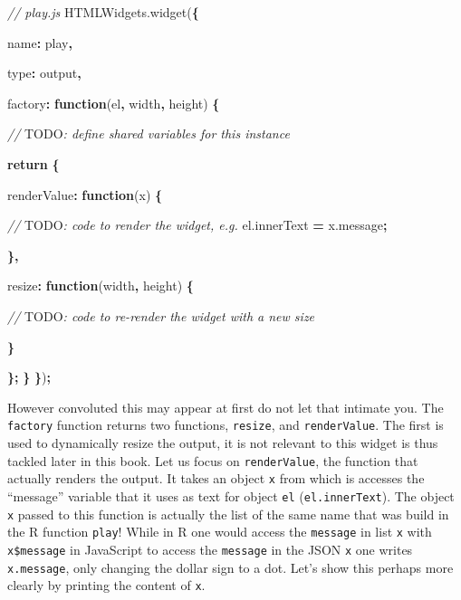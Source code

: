 \documentclass[
]{krantz}
\makeatletter
\newenvironment{Shaded}{\begin{snugshade}}{\end{snugshade}}
\newcommand{\AlertTok}[1]{\textcolor[rgb]{0.33,0.33,0.33}{#1}}
\newcommand{\AttributeTok}[1]{\textcolor[rgb]{0.61,0.61,0.61}{#1}}
\newcommand{\CommentTok}[1]{\textcolor[rgb]{0.37,0.37,0.37}{\textit{#1}}}
\newcommand{\ControlFlowTok}[1]{\textcolor[rgb]{0.27,0.27,0.27}{\textbf{#1}}}
\newcommand{\DataTypeTok}[1]{\textcolor[rgb]{0.27,0.27,0.27}{#1}}
\newcommand{\KeywordTok}[1]{\textcolor[rgb]{0.27,0.27,0.27}{\textbf{#1}}}
\newcommand{\NormalTok}[1]{#1}
\newcommand{\OperatorTok}[1]{\textcolor[rgb]{0.43,0.43,0.43}{\textbf{#1}}}
\newcommand{\StringTok}[1]{\textcolor[rgb]{0.5,0.5,0.5}{#1}}
\newcommand{\VariableTok}[1]{\textcolor[rgb]{0,0,0}{#1}}
\newenvironment{kframe}{%
\medskip{}
\setlength{\fboxsep}{.8em}
 \def\at@end@of@kframe{}%
 \ifinner\ifhmode%
  \def\at@end@of@kframe{\end{minipage}}%
  \begin{minipage}{\columnwidth}%
 \fi\fi%
 \def\FrameCommand##1{\hskip\@totalleftmargin \hskip-\fboxsep
 \colorbox{shadecolor}{##1}\hskip-\fboxsep
     \hskip-\linewidth \hskip-\@totalleftmargin \hskip\columnwidth}%
 \MakeFramed {\advance\hsize-\width
   \@totalleftmargin\z@ \linewidth\hsize
   \@setminipage}}%
 {\par\unskip\endMakeFramed%
 \at@end@of@kframe}
\renewenvironment{Shaded}{\begin{kframe}}{\end{kframe}}
\makeatother
\begin{document}
\begin{Shaded}
\begin{Highlighting}[]
\CommentTok{// play.js}
\VariableTok{HTMLWidgets}\NormalTok{.}\AttributeTok{widget}\NormalTok{(}\OperatorTok{\{}

  \DataTypeTok{name}\OperatorTok{:} \StringTok{\textquotesingle{}play\textquotesingle{}}\OperatorTok{,}

  \DataTypeTok{type}\OperatorTok{:} \StringTok{\textquotesingle{}output\textquotesingle{}}\OperatorTok{,}

  \DataTypeTok{factory}\OperatorTok{:} \KeywordTok{function}\NormalTok{(el}\OperatorTok{,}\NormalTok{ width}\OperatorTok{,}\NormalTok{ height) }\OperatorTok{\{}

    \CommentTok{// }\AlertTok{TODO}\CommentTok{: define shared variables for this instance}

    \ControlFlowTok{return} \OperatorTok{\{}

      \DataTypeTok{renderValue}\OperatorTok{:} \KeywordTok{function}\NormalTok{(x) }\OperatorTok{\{}

        \CommentTok{// }\AlertTok{TODO}\CommentTok{: code to render the widget, e.g.}
        \VariableTok{el}\NormalTok{.}\AttributeTok{innerText} \OperatorTok{=} \VariableTok{x}\NormalTok{.}\AttributeTok{message}\OperatorTok{;}

      \OperatorTok{\},}

      \DataTypeTok{resize}\OperatorTok{:} \KeywordTok{function}\NormalTok{(width}\OperatorTok{,}\NormalTok{ height) }\OperatorTok{\{}

        \CommentTok{// }\AlertTok{TODO}\CommentTok{: code to re{-}render the widget with a new size}

      \OperatorTok{\}}

    \OperatorTok{\};}
  \OperatorTok{\}}
\OperatorTok{\}}\NormalTok{)}\OperatorTok{;}
\end{Highlighting}
\end{Shaded}

However convoluted this may appear at first do not let that intimate you. The \texttt{factory} function returns two functions, \texttt{resize}, and \texttt{renderValue}. The first is used to dynamically resize the output, it is not relevant to this widget is thus tackled later in this book. Let us focus on \texttt{renderValue}, the function that actually renders the output. It takes an object \texttt{x} from which is accesses the ``message'' variable that it uses as text for object \texttt{el} (\texttt{el.innerText}). The object \texttt{x} passed to this function is actually the list of the same name that was build in the R function \texttt{play}! While in R one would access the \texttt{message} in list \texttt{x} with \texttt{x\$message} in JavaScript to access the \texttt{message} in the JSON \texttt{x} one writes \texttt{x.message}, only changing the dollar sign to a dot. Let's show this perhaps more clearly by printing the content of \texttt{x}.
\end{document}
